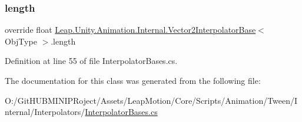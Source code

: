 \subsubsection{\texorpdfstring{length}{length}}
{\footnotesize\ttfamily override float \mbox{\hyperlink{class_leap_1_1_unity_1_1_animation_1_1_internal_1_1_vector2_interpolator_base}{Leap.\+Unity.\+Animation.\+Internal.\+Vector2\+Interpolator\+Base}}$<$ Obj\+Type $>$.length\hspace{0.3cm}{\ttfamily [get]}}



Definition at line 55 of file Interpolator\+Bases.\+cs.



The documentation for this class was generated from the following file\+:\begin{DoxyCompactItemize}
\item 
O\+:/\+Git\+H\+U\+B\+M\+I\+N\+I\+P\+Roject/\+Assets/\+Leap\+Motion/\+Core/\+Scripts/\+Animation/\+Tween/\+Internal/\+Interpolators/\mbox{\hyperlink{_interpolator_bases_8cs}{Interpolator\+Bases.\+cs}}\end{DoxyCompactItemize}
